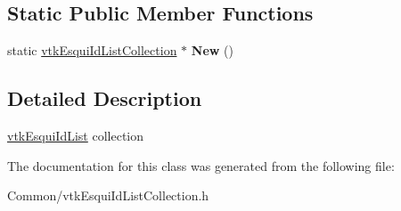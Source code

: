 \subsection*{Static Public Member Functions}
\begin{DoxyCompactItemize}
\item 
\hypertarget{classvtkEsquiIdListCollection_abd90562488e88c1f5e7d2355d7dc194e}{
static \hyperlink{classvtkEsquiIdListCollection}{vtkEsquiIdListCollection} $\ast$ {\bfseries New} ()}
\label{classvtkEsquiIdListCollection_abd90562488e88c1f5e7d2355d7dc194e}

\end{DoxyCompactItemize}


\subsection{Detailed Description}
\hyperlink{classvtkEsquiIdList}{vtkEsquiIdList} collection 

The documentation for this class was generated from the following file:\begin{DoxyCompactItemize}
\item 
Common/vtkEsquiIdListCollection.h\end{DoxyCompactItemize}
